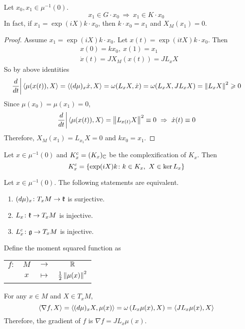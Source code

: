 \documentclass[a4paper,12pt]{article}
\begin{document}
	\begin{lem}
		Let $x_0,x_1 \in \mu^{-1}(0)$.
		\begin{equation*}
			x_1 \in G \cdot x_0 ~\Rightarrow~ x_1 \in K \cdot x_0
		\end{equation*}
		In fact, if $x_1 = \exp(iX)k \cdot x_0$, then $k \cdot x_0 = x_1$ and $X_M(x_1) = 0$.
	\end{lem}
	\begin{proof}
		Assume $x_1 = \exp(iX)k \cdot x_0$. Let $x(t) = \exp(itX)k \cdot x_0$. Then 
		\begin{equation*}
			\begin{split}
				&x(0) = kx_0,~x(1) = x_1 \\
				&\dot{x}(t) = JX_M(x(t)) = JL_xX
			\end{split}
		\end{equation*}
		So by above identities
		\begin{equation*}
			\left.\frac{d}{dt}\right\lvert\left\langle \mu(x(t)),X \right\rangle = \left\langle (d\mu)_x\dot{x},X \right\rangle = \omega(L_xX,\dot{x}) = \omega(L_xX,JL_xX) =\left\lVert L_xX\right\lVert^2 \geqslant 0
		\end{equation*}
		Since $\mu(x_0)=\mu(x_1) = 0$, 
		\begin{equation*}
			\left.\frac{d}{dt}\right\lvert\left\langle \mu(x(t)),X \right\rangle = \left\lVert L_{x(t)}X\right\lVert^2 \equiv 0~\Rightarrow~\dot{x}(t)\equiv 0
		\end{equation*}
		Therefore, $X_M(x_1) = L_{x_1}X = 0$ and $kx_0 = x_1$.
	\end{proof}
	\begin{cor}
		Let $x \in \mu^{-1}(0)$ and $K_x^c = (K_x)_{\mathbb{C}}$ be the complexification of $K_x$. Then
		\begin{equation*}
			K_x^c  = \left\{\exp(iX)k \colon k \in K_x,~X \in \ker L_x\right\}
		\end{equation*}
	\end{cor}

	\begin{lem}
		Let $x \in \mu^{-1}(0)$. The following statements are equivalent.
		\begin{enumerate}
			\item $(d\mu)_x \colon T_xM \rightarrow \mathfrak{k}$ is surjective.
			\item $L_x \colon \mathfrak{k} \rightarrow T_xM$ is injective.
			\item $L_x^c \colon \mathfrak{g} \rightarrow T_xM$ is injective.
		\end{enumerate}
	\end{lem}
	
	Define the moment squared function as
	\begin{center}
		\begin{tabular}{l c c c}
			$f \colon$ & $M$ & $\longrightarrow$ & $\mathbb{R}$ \\
			~ & $x$ & $\longmapsto$ & $\frac{1}{2}\left\lVert\mu(x)\right\lVert^2$
		\end{tabular}
	\end{center}
	For any $x\in M$ and $X \in T_x M$,
	\begin{equation*}
		\left\langle \nabla f,X \right\rangle = \left\langle (d\mu)_xX,\mu(x) \right\rangle = \omega\left(L_x\mu(x),X\right) = \left\langle JL_x\mu(x),X \right\rangle
	\end{equation*}
	Therefore, the gradient of $f$ is $\nabla f = JL_x\mu(x)$. 
\end{document}
